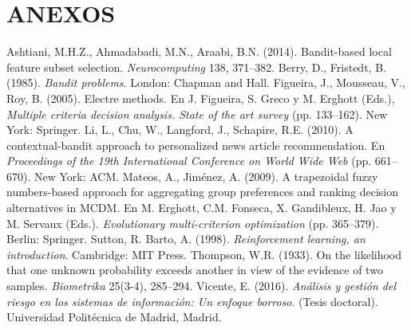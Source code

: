 \documentclass[spanish,12pt, a4paper, twoside]{paper}
\let\oldsection\section
\def\section{\cleardoublepage\oldsection}
\begin{document}
\section*{ANEXOS}


\newpage

\begin{thebibliography}{00}
  Ashtiani, M.H.Z., Ahmadabadi, M.N., Araabi, B.N. (2014). Bandit-based local feature subset selection. \emph{Neurocomputing} 138, 371--382.
 Berry, D., Fristedt, B. (1985). \emph{Bandit problems}. London: Chapman and Hall.
 Figueira, J., Mousseau, V., Roy, B. (2005). Electre methods. En J. Figueira, S. Greco y M. Erghott (Eds.), \emph{Multiple criteria decision analysis. State of the art survey} (pp. 133--162). New York: Springer.
 Li, L., Chu, W., Langford, J., Schapire, R.E. (2010). A contextual-bandit approach to personalized news article recommendation. En \emph{Proceedings of the 19th International Conference on World Wide Web} (pp. 661--670). New York: ACM.
 Mateos, A., Jiménez, A. (2009). A trapezoidal fuzzy numbers-based approach for aggregating group preferences and ranking decision alternatives in MCDM. En M. Erghott, C.M. Fonseca, X. Gandibleux, H. Jao y M. Servaux (Eds.). \emph{Evolutionary multi-criterion optimization} (pp. 365--379). Berlin: Springer.
 Sutton, R. Barto, A. (1998). \emph{Reinforcement learning, an introduction}. Cambridge: MIT Press.
 Thompson, W.R. (1933). On the likelihood that one unknown probability exceeds another in view of the evidence of two samples. \emph{Biometrika} 25(3-4), 285--294.
 Vicente, E. (2016). \emph{Análisis y gestión del riesgo en los sistemas de información: Un enfoque borroso}. (Tesis doctoral). Universidad Politécnica de Madrid, Madrid.


\end{thebibliography}
\end{document}

